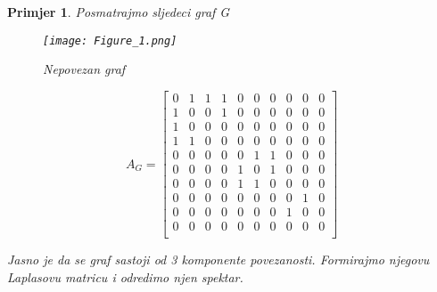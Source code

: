 \documentclass[11pt]{article}
\newtheorem{example}{Primjer}
\begin{document}
		\begin{example}
		Posmatrajmo sljedeci graf G
		\begin{figure}[h]
			\centering
			\texttt{[image: Figure\_1.png]}
			\caption{Nepovezan graf}
		\end{figure}
		\[
			A_G =
			\begin{bmatrix}
				0  &  1  &  1  &  1  &  0  & 0  &  0  &  0  &  0  &  0\\
				1  &  0  &  0  &  1  &  0  & 0  &  0  &  0  &  0  &  0\\
				1  &  0  &  0  &  0  &  0  & 0  &  0  &  0  &  0  &  0\\
				1  &  1  &  0  &  0  &  0  & 0  &  0  &  0  &  0  &  0\\
				0  &  0  &  0  &  0  &  0  & 1  &  1  &  0  &  0  &  0\\
				0  &  0  &  0  &  0  &  1  & 0  &  1  &  0  &  0  &  0\\
				0  &  0  &  0  &  0  &  1  & 1  &  0  &  0  &  0  &  0\\
				0  &  0  &  0  &  0  &  0  & 0  &  0  &  0  &  1  &  0\\
				0  &  0  &  0  &  0  &  0  & 0  &  0  &  1  &  0  &  0\\
				0  &  0  &  0  &  0  &  0  & 0  &  0  &  0  &  0  &  0\\
			\end{bmatrix}
			\]
			
			Jasno je da se graf sastoji od 3 komponente povezanosti. Formirajmo njegovu Laplasovu matricu i odredimo njen spektar.
			

\end{example}
\end{document}
